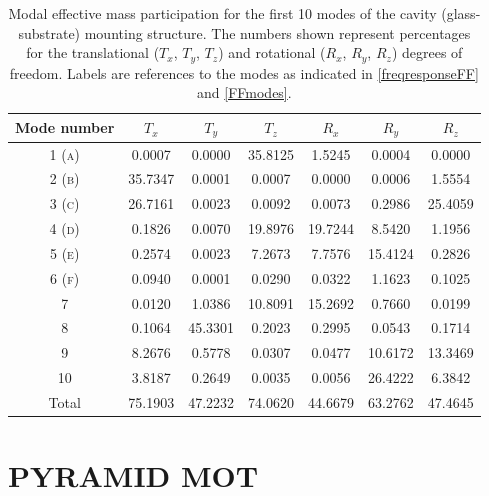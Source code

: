 \documentclass[../Thesis-IJspeert.tex]{subfiles}
\begin{document}
\begin{table}[h]
	\centering
	\begin{tabular}{ccccccc}
		\toprule
		{Mode number} & { ${T}_x$} & {${T}_y$} & {${T}_z$} & {${R}_x$} & {${R}_y$} & {${R}_z$} \\
		\midrule
		1 \textsc{(a)} & 0.0007 & 0.0000 & 35.8125 & 1.5245 & 0.0004 & 0.0000 \\
		2 \textsc{(b)} & 35.7347 & 0.0001 & 0.0007 & 0.0000 & 0.0006 & 1.5554 \\
		3 \textsc{(c)} & 26.7161 & 0.0023 & 0.0092 & 0.0073 & 0.2986 & 25.4059 \\
		4 \textsc{(d)} & 0.1826 & 0.0070 & 19.8976 & 19.7244 & 8.5420 & 1.1956 \\
		5 \textsc{(e)} & 0.2574 & 0.0023 & 7.2673 & 7.7576 & 15.4124 & 0.2826 \\
		6 \textsc{(f)} & 0.0940 & 0.0001 & 0.0290 & 0.0322 & 1.1623 & 0.1025 \\
		7 & 0.0120 & 1.0386 & 10.8091 & 15.2692 & 0.7660 & 0.0199 \\
		8 & 0.1064 & 45.3301 & 0.2023 & 0.2995 & 0.0543 & 0.1714 \\
		9 & 8.2676 & 0.5778 & 0.0307 & 0.0477 & 10.6172 & 13.3469 \\
		10 & 3.8187 & 0.2649 & 0.0035 & 0.0056 & 26.4222 & 6.3842 \\
		\midrule
		{Total} & 75.1903 & 47.2232 & 74.0620 & 44.6679 & 63.2762 & 47.4645 \\
		\bottomrule
	\end{tabular}
\caption[Percentages of modal effective mass for cavity (glass-substrate) mounting structure]{Modal effective mass participation for the first 10 modes of the cavity (glass-substrate) mounting structure. The numbers shown represent percentages for the translational (${T}_x$, ${T}_y$, ${T}_z$) and rotational (${R}_x$, ${R}_y$, ${R}_z$) degrees of freedom. Labels are references to the modes as indicated in \autoref{freqresponseFF} and \autoref{FFmodes}.}
	\label{tab:modepercentFinalfinger}   
\end{table}







\section{PYRAMID MOT}
\end{document}
